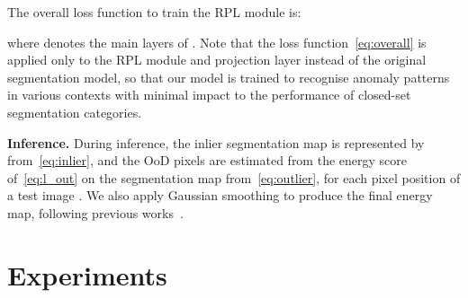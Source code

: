 \documentclass[10pt,twocolumn,letterpaper]{article}
\begin{document}
The overall loss function to train the RPL module is:

where  denotes the main layers of .
Note that the loss function~\eqref{eq:overall} is applied only to the RPL module and projection layer instead of the original segmentation model, so that our model is trained to recognise anomaly patterns in various contexts with minimal impact to the performance of closed-set segmentation categories. 


\noindent \textbf{Inference.} 
During inference,
the inlier segmentation map is represented by  from~\eqref{eq:inlier}, and the OoD pixels are estimated from the energy score  of~\eqref{eq:l_out} on the segmentation map  from~\eqref{eq:outlier}, for each pixel position  of a test image . 
We also apply Gaussian smoothing to produce the final energy map, following  previous works~\cite{tian2021pixel, jung2021standardized}.





\section{Experiments}
\end{document}
